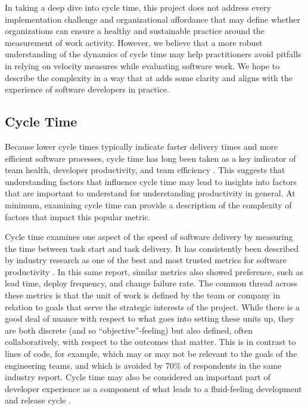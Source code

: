 \documentclass[manuscript,screen,review]{acmart}
\begin{document}
In taking a deep dive into cycle time, this project does not address
every implementation challenge and organizational affordance that may
define whether organizations can ensure a healthy and sustainable
practice around the measurement of work activity. However, we believe
that a more robust understanding of the dynamics of cycle time may help
practitioners avoid pitfalls in relying on velocity measures while
evaluating software work. We hope to describe the complexity in a way
that at adds some clarity and aligns with the experience of software
developers in practice.

\subsection{Cycle Time}\label{cycle-time}

Because lower cycle times typically indicate faster delivery times and
more efficient software processes, cycle time has long been taken as a
key indicator of team health, developer productivity, and team
efficiency
\citep{clincySoftwareDevelopmentProductivity2003, agrawalSoftwareEffortQuality2007, carmelCycleTimePackaged1995, eversImprovingEngineeringProductivity1998, guptaKeyDriversReduced1998, nanImpactBudgetSchedule2009, ruvimovaExploratoryStudyProductivity2022, sadowskiRethinkingProductivitySoftware2019, trendowiczChapter6Factors2009}.
This suggests that understanding factors that influence cycle time may
lead to insights into factors that are important to understand for
understanding productivity in general. At minimum, examining cycle time
can provide a description of the complexity of factors that impact this
popular metric.

Cycle time examines one aspect of the speed of software delivery by
measuring the time between task start and task delivery. It has
consistently been described by industry research as one of the best and
most trusted metrics for software productivity
\citep{careyWhy70Engineers2024}. In this same report, similar metrics
also showed preference, such as lead time, deploy frequency, and change
failure rate. The common thread across these metrics is that the unit of
work is defined by the team or company in relation to goals that serve
the strategic interests of the project. While there is a good deal of
nuance with respect to what goes into setting these units up, they are
both discrete (and so ``objective''-feeling) but also defined, often
collaboratively, with respect to the outcomes that matter. This is in
contrast to lines of code, for example, which may or may not be relevant
to the goals of the engineering teams, and which is avoided by 70\% of
respondents in the same industry report. Cycle time may also be
considered an important part of developer experience as a component of
what leads to a fluid-feeling development and release cycle
\citep{greilerActionableFrameworkUnderstanding2022a}.
\end{document}
